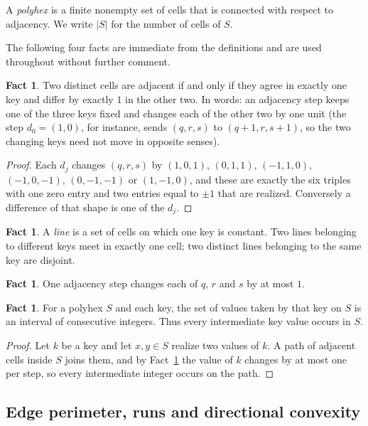 \documentclass[11pt]{article}
\theoremstyle{plain}
\theoremstyle{definition}
\newtheorem{fact}[theorem]{Fact}
\theoremstyle{remark}
\begin{document}
A \emph{polyhex} is a finite nonempty set of cells that is connected with respect to
adjacency. We write \(|S|\) for the number of cells of \(S\).

The following four facts are immediate from the definitions and are used throughout
without further comment.

\begin{fact}\label{f:1}
Two distinct cells are adjacent if and only if they agree in exactly one key and differ
by exactly \(1\) in the other two. In words: an adjacency step keeps one of the three
keys fixed and changes each of the other two by one unit (the step \(d_{0}=(1,0)\), for
instance, sends \((q,r,s)\) to \((q+1,r,s+1)\), so the two changing keys need not move
in opposite senses).
\end{fact}

\begin{proof}
Each \(d_{j}\) changes \((q,r,s)\) by \((1,0,1)\), \((0,1,1)\), \((-1,1,0)\),
\((-1,0,-1)\), \((0,-1,-1)\) or \((1,-1,0)\), and these are exactly the six triples with
one zero entry and two entries equal to \(\pm1\) that are realized. Conversely a
difference of that shape is one of the \(d_{j}\).
\end{proof}

\begin{fact}\label{f:2}
A \emph{line} is a set of cells on which one key is constant. Two lines belonging to
different keys meet in exactly one cell; two distinct lines belonging to the same key are
disjoint.
\end{fact}

\begin{fact}\label{f:3}
One adjacency step changes each of \(q\), \(r\) and \(s\) by at most \(1\).
\end{fact}

\begin{fact}\label{f:4}
For a polyhex \(S\) and each key, the set of values taken by that key on \(S\) is an
interval of consecutive integers. Thus every intermediate key value occurs in \(S\).
\end{fact}

\begin{proof}
Let \(k\) be a key and let \(x,y\in S\) realize two values of \(k\). A path of adjacent
cells inside \(S\) joins them, and by Fact~\ref{f:3} the value of \(k\) changes by at most
one per step, so every intermediate integer occurs on the path.
\end{proof}

\subsection{Edge perimeter, runs and directional convexity}\label{sec:2.2}
\end{document}
